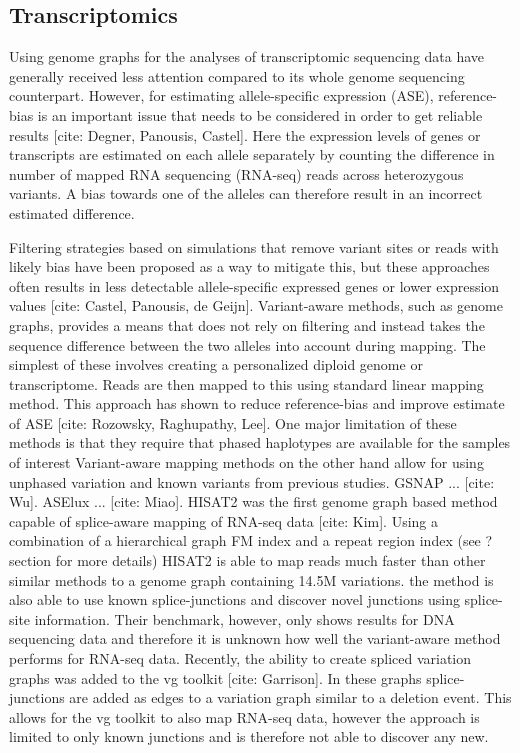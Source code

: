 \subsection{Transcriptomics}

Using genome graphs for the analyses of transcriptomic sequencing data have generally received less attention compared to its whole genome sequencing counterpart.
However, for estimating allele-specific expression (ASE), reference-bias is an important issue that needs to be considered in order to get reliable results [cite: Degner, Panousis, Castel].
Here the expression levels of genes or transcripts are estimated on each allele separately by counting the difference in number of mapped RNA sequencing (RNA-seq) reads across heterozygous variants.
A bias towards one of the alleles can therefore result in an incorrect estimated difference.

Filtering strategies based on simulations that remove variant sites or reads with likely bias have been proposed as a way to mitigate this, but these approaches often results in less detectable allele-specific expressed genes or lower expression values [cite: Castel, Panousis, de Geijn].
Variant-aware methods, such as genome graphs, provides a means that does not rely on filtering and instead takes the sequence difference between the two alleles into account during mapping.
The simplest of these involves creating a personalized diploid genome or transcriptome.
Reads are then mapped to this using standard linear mapping method.
This approach has shown to reduce reference-bias and improve estimate of ASE [cite: Rozowsky, Raghupathy, Lee].
One major limitation of these methods is that they require that phased haplotypes are available for the samples of interest 
Variant-aware mapping methods on the other hand allow for using unphased variation and known variants from previous studies.
GSNAP ... [cite: Wu]. 
ASElux ... [cite: Miao].
HISAT2 was the first genome graph based method capable of splice-aware mapping of RNA-seq data [cite: Kim]. 
Using a combination of a hierarchical graph FM index and a repeat region index (see ? section for more details) HISAT2 is able to map reads much faster than other similar methods to a genome graph containing 14.5M variations. 
the method is also able to use known splice-junctions and discover novel junctions using splice-site information.
Their benchmark, however, only shows results for DNA sequencing data and therefore it is unknown how well the variant-aware method performs for RNA-seq data.
Recently, the ability to create spliced variation graphs was added to the vg toolkit [cite: Garrison]. 
In these graphs splice-junctions are added as edges to a variation graph similar to a deletion event. 
This allows for the vg toolkit to also map RNA-seq data, however the approach is limited to only known junctions and is therefore not able to discover any new.

